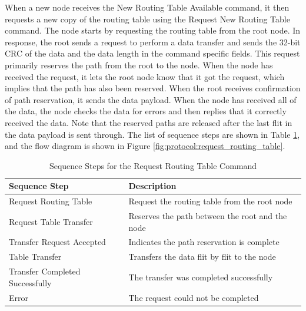 When a new node receives the New Routing Table Available command, it then requests a new copy of the routing table using the Request New Routing Table command. The node starts by requesting the routing table from the root node. In response, the root sends a request to perform a data transfer and sends the 32-bit CRC of the data and the data length in the command specific fields. This request primarily reserves the path from the root to the node. When the node has received the request, it lets the root node know that it got the request, which implies that the path has also been reserved. When the root receives confirmation of path reservation, it sends the data payload. When the node has received all of the data, the node checks the data for errors and then replies that it correctly received the data. Note that the reserved paths are released after the last flit in the data payload is sent through. The list of sequence steps are shown in Table \ref{tab:protocol:request_routing_table}, and the flow diagram is shown in Figure \ref{fig:protocol:request_routing_table}.

\begin{table}
	\begin{center}
		\setlength{\extrarowheight}{1.5pt}
		\caption{Sequence Steps for the Request Routing Table Command}
		\vspace{0.1cm}
		\begin{tabular}{|l|l|}
			\hline
			\textbf{Sequence Step} & \textbf{Description} \\
			\hline
			\hline
			Request Routing Table & Request the routing table from the root node \\
			\hline
			Request Table Transfer & Reserves the path between the root and the node \\
			\hline
			Transfer Request Accepted & Indicates the path reservation is complete \\
			\hline
			Table Transfer & Transfers the data flit by flit to the node \\
			\hline
			Transfer Completed Successfully & The transfer was completed successfully \\
			\hline
			Error & The request could not be completed \\
			\hline
		\end{tabular}
		\label{tab:protocol:request_routing_table}
	\end{center}
\end{table}

